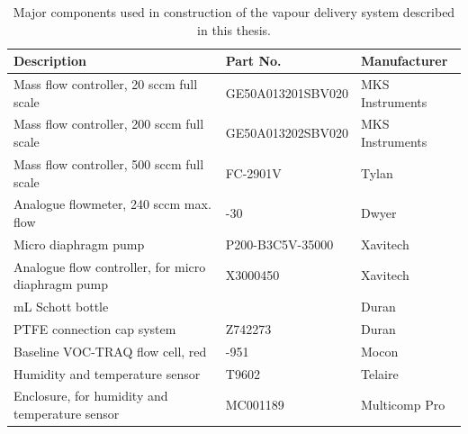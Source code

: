 \documentclass[
  a4paper,
]{scrbook}
\begin{document}
\hypertarget{tbl-vapour-sensor-components}{}
\begin{longtable}[t]{>{\raggedright\arraybackslash}p{5.5cm}>{\raggedright\arraybackslash}p{4.5cm}>{\raggedright\arraybackslash}p{3.75cm}}
\caption{\label{tbl-vapour-sensor-components}Major components used in construction of the vapour delivery system
described in this thesis. }\tabularnewline

\toprule
Description & Part No. & Manufacturer\\
\midrule
Mass flow controller, 20 sccm full scale & GE50A013201SBV020 & MKS Instruments\\
Mass flow controller, 200 sccm full scale & GE50A013202SBV020 & MKS Instruments\\
Mass flow controller, 500 sccm full scale & FC-2901V & Tylan\\
Analogue flowmeter, 240 sccm max. flow & 116261-30 & Dwyer\\
Micro diaphragm pump & P200-B3C5V-35000 & Xavitech\\
\addlinespace
Analogue flow controller, for micro diaphragm pump & X3000450 & Xavitech\\
10 mL Schott bottle & 218010802 & Duran\\
PTFE connection cap system & Z742273 & Duran\\
Baseline VOC-TRAQ flow cell, red & 043-951 & Mocon\\
Humidity and temperature sensor & T9602 & Telaire\\
\addlinespace
Enclosure, for humidity and temperature sensor & MC001189 & Multicomp Pro\\
\bottomrule
\end{longtable}


\backmatter
\printbibliography
\end{document}
